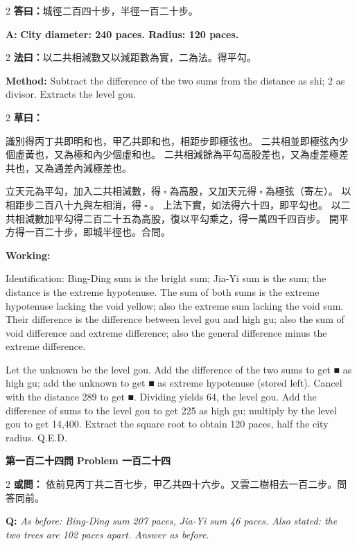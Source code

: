 \documentclass[11pt,a4paper]{article}
\let\origsquare\square
\renewcommand{\square}{\ensuremath{\origsquare}}%
\newcommand{\wen}[1]{%
  \par\vspace{0.5em}%
  \noindent\textcolor{problemcolor}{\textbf{第#1問}}%
  \hfill\textcolor{problemcolor}{\textbf{Problem #1}}\par\nopagebreak%
  \vspace{0.3em}%
}
\newcommand{\owen}[1]{%
  \noindent\textcolor{problemcolor}{\textbf{或問：}}{\tradfont #1}\par\nopagebreak%
}
\newcommand{\oweneng}[1]{%
  \noindent\textcolor{engcolor}{\textbf{Q: }}{\itshape #1}\par\nopagebreak%
}
\newcommand{\fayue}[1]{%
  \noindent\textcolor{methodcolor}{\textbf{法曰：}}{\tradfont #1}\par\nopagebreak%
}
\newcommand{\fayueeng}[1]{%
  \noindent\textcolor{engcolor}{\textbf{Method: }}{#1}\par\nopagebreak%
}
\newcommand{\tsaoyue}[1]{%
  \noindent\textcolor{workcolor}{\textbf{草曰：}}{\tradfont #1}\par%
}
\newcommand{\tsaoyueeng}[1]{%
  \noindent\textcolor{engcolor}{\textbf{Working: }}{\small #1}\par%
}
\newcommand{\dayue}[1]{%
  \noindent\textcolor{anscolor}{\textbf{答曰：}}{\tradfont #1}\par\nopagebreak%
}
\newcommand{\dayueeng}[1]{%
  \noindent\textcolor{engcolor}{\textbf{A: }}{\bfseries #1}\par\nopagebreak%
}
\begin{document}
\begin{paracol}{2}
\dayue{城徑二百四十步，半徑一百二十步。}
\switchcolumn
\dayueeng{City diameter: 240 paces. Radius: 120 paces.}
\end{paracol}

\begin{paracol}{2}
\fayue{以二共相減數又以減距數為實，二為法。得平勾。}
\switchcolumn
\fayueeng{Subtract the difference of the two sums from the distance as shi; 2 as divisor. Extracts the level gou.}
\end{paracol}

\begin{paracol}{2}
\tsaoyue{%
識別得丙丁共即明和也，甲乙共即和也，相距步即極弦也。
二共相並即極弦內少個虛黃也，又為極和內少個虛和也。
二共相減餘為平勾高股差也，又為虛差極差共也，又為通差內減極差也。

立天元為平勾，加入二共相減數，得$ \; \square \; $為高股，又加天元得$ \; \square \; $為極弦（寄左）。
以相距步二百八十九與左相消，得$ \; \square \; $。
上法下實，如法得六十四，即平勾也。
以二共相減數加平勾得二百二十五為高股，復以平勾乘之，得一萬四千四百步。
開平方得一百二十步，即城半徑也。合問。}
\switchcolumn
\tsaoyueeng{%
Identification: Bing-Ding sum is the bright sum; Jia-Yi sum is the sum; the distance is the extreme hypotenuse. The sum of both sums is the extreme hypotenuse lacking the void yellow; also the extreme sum lacking the void sum. Their difference is the difference between level gou and high gu; also the sum of void difference and extreme difference; also the general difference minus the extreme difference.

Let the unknown be the level gou. Add the difference of the two sums to get ■ as high gu; add the unknown to get ■ as extreme hypotenuse (stored left). Cancel with the distance 289 to get ■. Dividing yields 64, the level gou. Add the difference of sums to the level gou to get 225 as high gu; multiply by the level gou to get 14,400. Extract the square root to obtain 120 paces, half the city radius. Q.E.D.}
\end{paracol}

\vspace{0.5cm}

\wen{一百二十四}

\begin{paracol}{2}
\owen{%
依前見丙丁共二百七步，甲乙共四十六步。又雲二樹相去一百二步。問答同前。}
\switchcolumn
\oweneng{%
As before: Bing-Ding sum 207 paces, Jia-Yi sum 46 paces. Also stated: the two trees are 102 paces apart. Answer as before.}
\end{paracol}
\end{document}
